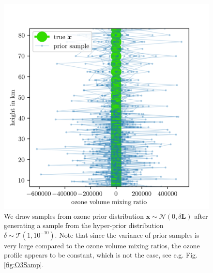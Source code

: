 \begin{figure}[ht!]
	\centering
	\includegraphics{OzonePrior.png}
	\caption[Samples from ozone prior distribution.]{We draw samples from ozone prior distribution $\bm{x} \sim \mathcal{N}(0,\delta \bm{L})$ after generating a sample from the hyper-prior distribution $\delta \sim \mathcal{T}(1,10^{-10})$. Note that since the variance of prior samples is very large compared to the ozone volume mixing ratios, the ozone profile appears to be constant, which is not the case, see e.g. Fig. \ref{fig:O3Samp}.}
	\label{fig:O3Prior}
\end{figure}


\clearpage
